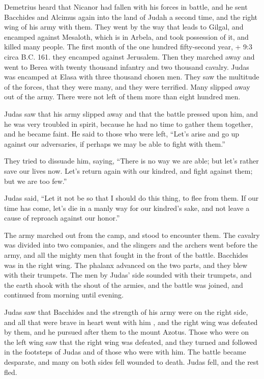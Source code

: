  Demetrius heard that Nicanor had fallen with his forces in
battle, and he sent Bacchides and Alcimus again into the land of Judah a
second time, and the right wing of his army with them.  They
went by the way that leads to Gilgal, and encamped against Mesaloth,
which is in Arbela, and took possession of it, and killed many people.
 The first month of the one hundred fifty-second year, + 9:3
circa B.C. 161. they encamped against Jerusalem.  Then they
marched away and went to Berea with twenty thousand infantry and two
thousand cavalry.  Judas was encamped at Elasa with three
thousand chosen men.  They saw the multitude of the forces,
that they were many, and they were terrified. Many slipped away out of
the army. There were not left of them more than eight hundred men.

 Judas saw that his army slipped away and that the battle
pressed upon him, and he was very troubled in spirit, because he had no
time to gather them together, and he became faint.  He said
to those who were left, ``Let's arise and go up against our adversaries,
if perhaps we may be able to fight with them.''

 They tried to dissuade him, saying, ``There is no way we
are able; but let's rather save our lives now. Let's return again with
our kindred, and fight against them; but we are too few.''

 Judas said, ``Let it not be so that I should do this
thing, to flee from them. If our time has come, let's die in a manly way
for our kindred's sake, and not leave a cause of reproach against our
honor.''

 The army marched out from the camp, and stood to encounter
them. The cavalry was divided into two companies, and the slingers and
the archers went before the army, and all the mighty men that fought in
the front of the battle.  Bacchides was in the right wing.
The phalanx advanced on the two parts, and they blew with their
trumpets.  The men by Judas' side sounded with their
trumpets, and the earth shook with the shout of the armies, and the
battle was joined, and continued from morning until evening.

 Judas saw that Bacchides and the strength of his army were
on the right side, and all that were brave in heart went with him ,
 and the right wing was defeated by them, and he pursued
after them to the mount Azotus.  Those who were on the left
wing saw that the right wing was defeated, and they turned and followed
in the footsteps of Judas and of those who were with him. 
The battle became desparate, and many on both sides fell wounded to
death.  Judas fell, and the rest fled.

